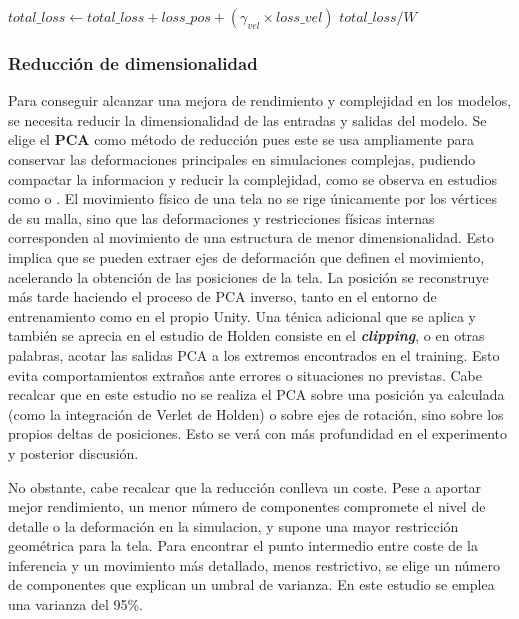 \begin{algorithm}[H]
\begin{algorithmic}
{    \BlankLine
    \State $total\_loss \gets total\_loss + loss\_pos + (\gamma_{vel} \times loss\_vel)$
    }
    \State \Return $total\_loss / W$

\BlankLine
\EndFunction
\end{algorithmic}
\end{algorithm}

\subsubsection{Reducción de dimensionalidad}
Para conseguir alcanzar una mejora de rendimiento y complejidad en los modelos, se necesita reducir la dimensionalidad de las entradas y salidas del modelo. Se elige el \textbf{PCA} como método de reducción pues este se usa ampliamente para conservar las deformaciones principales en simulaciones complejas, pudiendo compactar la informacion y reducir la complejidad, como se observa en estudios como \cite{holden_subspace_2019} o \cite{chentanez_cloth_2020}. El movimiento físico de una tela no se rige únicamente por los vértices de su malla, sino que las deformaciones y restricciones físicas internas corresponden al movimiento de una estructura de menor dimensionalidad. Esto implica que se pueden extraer ejes de deformación que definen el movimiento, acelerando la obtención de las posiciones de la tela. La posición se reconstruye más tarde haciendo el proceso de PCA inverso, tanto en el entorno de entrenamiento como en el propio Unity. Una ténica adicional que se aplica y también se aprecia en el estudio de Holden consiste en el \textbf{\textit{clipping}}, o en otras palabras, acotar las salidas PCA a los extremos encontrados en el training. Esto evita comportamientos extraños ante errores o situaciones no previstas. Cabe recalcar que en este estudio no se realiza el PCA sobre una posición ya calculada (como la integración de Verlet de Holden) o sobre ejes de rotación, sino sobre los propios deltas de posiciones. Esto se verá con más profundidad en el experimento y posterior discusión. \newline

No obstante, cabe recalcar que la reducción conlleva un coste. Pese a aportar mejor rendimiento, un menor número de componentes compromete el nivel de detalle o la deformación en la simulacion, y supone una mayor restricción geométrica para la tela. Para encontrar el punto intermedio entre coste de la inferencia y un movimiento más detallado, menos restrictivo, se elige un número de componentes que explican un umbral de varianza. En este estudio se emplea una varianza del 95\%. \newline %

